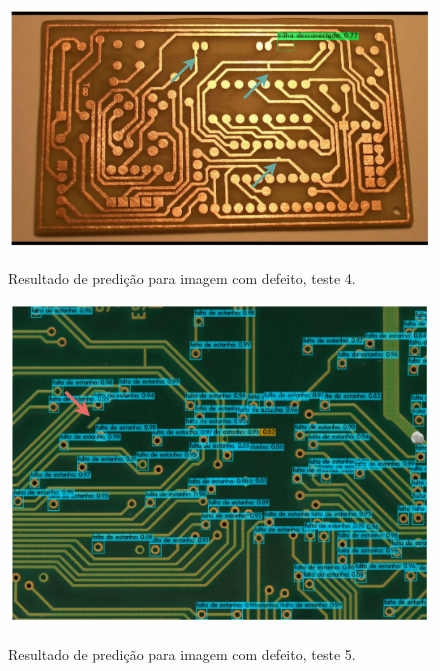 \begin{figure}[H] %
  \centering
  \caption{Resultado de predição para imagem com defeito, teste 4.}
  \includegraphics[scale=0.95]{img/img-resultados-predicao-ruim-1.pdf}
  \label{fig:resultados-predicao-ruim-1}
\end{figure}

\begin{figure}[!h] %
  \centering
  \caption{Resultado de predição para imagem com defeito, teste 5.}
  \includegraphics[scale=0.95]{img/img-resultados-predicao-ruim-2.pdf}
  \label{fig:resultados-predicao-ruim-2}
\end{figure}
